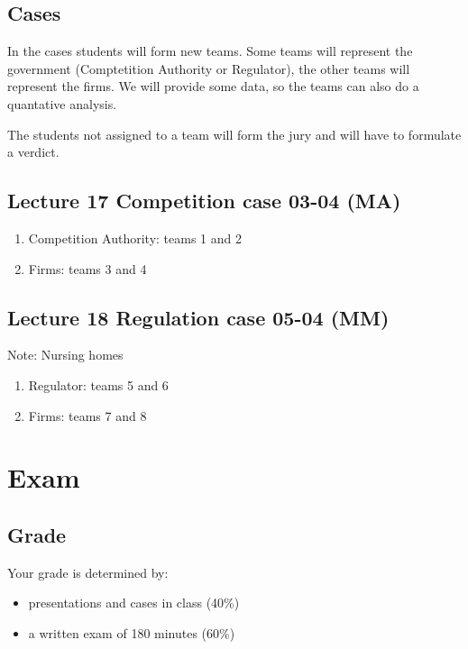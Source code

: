 \documentclass[]{book}
\providecommand{\tightlist}{%
  \setlength{\itemsep}{0pt}\setlength{\parskip}{0pt}}
\begin{document}
\section{Cases}\label{cases}

In the cases students will form new teams. Some teams will represent the
government (Comptetition Authority or Regulator), the other teams will
represent the firms. We will provide some data, so the teams can also do
a quantative analysis.

The students not assigned to a team will form the jury and will have to
formulate a verdict.

\section{Lecture 17 Competition case 03-04
(MA)}\label{lecture-17-competition-case-03-04-ma}

\begin{enumerate}
\def\labelenumi{\alph{enumi}.}
\tightlist
\item
  Competition Authority: teams 1 and 2
\item
  Firms: teams 3 and 4
\end{enumerate}

\section{Lecture 18 Regulation case 05-04
(MM)}\label{lecture-18-regulation-case-05-04-mm}

Note: Nursing homes

\begin{enumerate}
\def\labelenumi{\alph{enumi}.}
\tightlist
\item
  Regulator: teams 5 and 6
\item
  Firms: teams 7 and 8
\end{enumerate}

\chapter{Exam}\label{exam}

\section{Grade}\label{grade}

Your grade is determined by:

\begin{itemize}
\tightlist
\item
  presentations and cases in class (40\%)
\item
  a written exam of 180 minutes (60\%)
\end{itemize}


\end{document}

